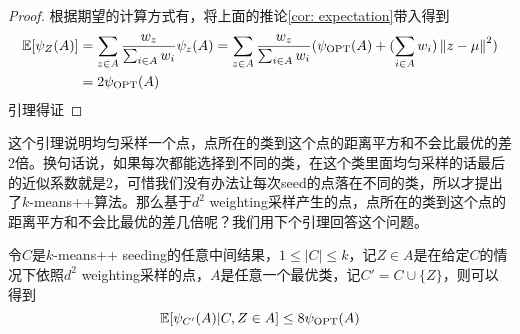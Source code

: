 \begin{proof}
    根据期望的计算方式有，将上面的推论\ref{cor: expectation}带入得到
    \begin{align}
        \mathbb{E}[\psi_Z(A)] &= \sum_{z \in A} \frac{w_z}{\sum_{i \in A} w_i} \psi_z(A) = \sum_{z \in A} \frac{w_z}{\sum_{i \in A} w_i} (\psi_{\text{OPT}}(A)+(\sum_{i \in A}w_i) \left\lVert z-\mu\right\rVert^2) \\
        &= 2 \psi_{\text{OPT}}(A)
    \end{align}
    引理得证
\end{proof}
这个引理说明均匀采样一个点，点所在的类到这个点的距离平方和不会比最优的差2倍。换句话说，如果每次都能选择到不同的类，在这个类里面均匀采样的话最后的近似系数就是2，可惜我们没有办法让每次seed的点落在不同的类，所以才提出了$k$-means++算法。那么基于$d^2$ weighting采样产生的点，点所在的类到这个点的距离平方和不会比最优的差几倍呢？我们用下个引理回答这个问题。
\begin{lemma}
    \label{lem: 8OPT_A}
    令$C$是$k$-means++ seeding的任意中间结果，$1 \leq |C| \leq k$，记$Z \in A$是在给定$C$的情况下依照$d^2$ weighting采样的点，$A$是任意一个最优类，记$C' = C \cup \{Z\}$，则可以得到
    \begin{equation}
        \mathbb{E}[\psi_{C'}(A)|C,Z \in A] \leq 8 \psi_{\text{OPT}}(A)
    \end{equation}
\end{lemma}
